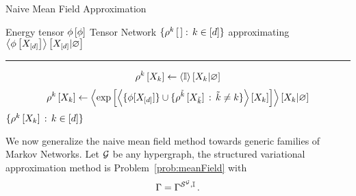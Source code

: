 \begin{algorithm}[h!]
    \caption{Naive Mean Field Approximation}\label{alg:NMF}
    \begin{algorithmic}
        \Require Energy tensor $\phi\left[\phi\right]$
        \Ensure Tensor Network $\{\rho^{k}\left[\,\right] : \, k\in[d]\}$ approximating $\left\langle \phi\left[X_{[d]}\right]\right\rangle \left[ X_{[d]} | \varnothing \right]$
        \hrule
        \For{$\catenumeratorin$}
            \State
            \begin{align*}
                \rho^{k}\left[X_{k}\right]
                \leftarrow \left\langle \mathbb{I}\right\rangle \left[ X_{k} | \varnothing \right]
            \end{align*}
        \EndFor
            \For{$\catenumeratorin$}
                \State
                \[ \rho^{k}\left[X_{k}\right]
                \leftarrow \left\langle  \mathrm{exp}\left[ \left\langle  \{\phi[X_{[d]}] \}\cup
                \{\rho^{\tilde{k}}\left[X_{\tilde{k}}\right] \, : \, \tilde{k}\neq k\} \right\rangle \left[ X_{k} \right] \right]
                \right\rangle \left[ X_{k} | \varnothing \right] \]
            \EndFor
        \EndWhile
        \State \Return $\{\rho^{k}\left[X_{k}\right] \, : \, k\in[d]\}$
    \end{algorithmic}
\end{algorithm}




We now generalize the naive mean field method towards generic families of Markov Networks.
Let $\mathcal{G}$ be any hypergraph, the structured variational approximation method is Problem~\eqref{prob:meanField} with
\begin{align*}
    \Gamma = \Gamma^{\mathcal{S}^{\mathcal{G}},\mathbb{I}} \, .
\end{align*}

